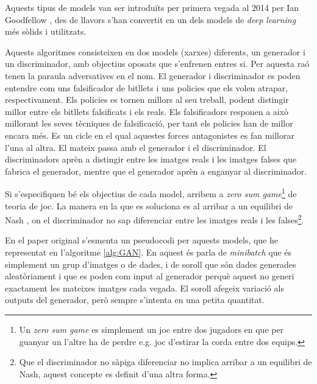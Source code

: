 Aquests tipus de models van ser introduïts per primera vegada al 2014 per Ian Goodfellow \cite{GAN2014}, des de llavors s'han convertit en un dels models de \textit{deep learning} més sòlids i utilitzats. 

Aquests algoritmes consisteixen en dos models (xarxes) diferents, un generador i un discriminador, amb objectius oposats que s'enfrenen entres si. Per aquesta raó tenen la paraula adversatives en el nom. El generador i discriminador es poden entendre com uns falsificador de bitllets i uns policies que els volen atrapar, respectivament. Els policies es tornen millors al seu treball, podent distingir millor entre els bitllets falsificats i els reals. Els falsificadors responen a això millorant les seves tècniques de falsificació, per tant els policies han de millor encara més. Es un cicle en el qual aquestes forces antagonistes es fan millorar l'una al altra. El mateix passa amb el generador i el discriminador. El discriminadors aprèn a distingir entre les imatges reals i les imatges falses que fabrica el generador, mentre que el generador aprèn a enganyar al discriminador. 

Si s'especifiquen bé els objectius de cada model, arribem a \textit{zero sum game}\footnote{Un \textit{zero sum game} es simplement un joc entre dos jugadors en que per guanyar un l'altre ha de perdre e.g. joc d'estirar la corda entre dos equips.} de teoria de joc. La manera en la que es soluciona es al arribar a un equilibri de Nash \cite{QGAN_exp}, on el discriminador no sap diferenciar entre les imatges reals i les falses\footnote{Que el discriminador no sàpiga diferenciar no implica arribar a un equilibri de Nash, aquest concepte es definit d'una altra forma.}.

En el paper original \cite{GAN2014} s'esmenta un pseudocodi per aquests models, que he representat en l'algoritme \ref{alg:GAN}. En aquest és parla de \textit{minibatch} que és simplement un grup d'imatges o de dades, i de soroll que són dades generades aleatòriament i que es poden com input al generador perquè aquest no generi exactament les mateixes imatges cada vegada. El soroll afegeix variació als outputs del generador, però sempre s'intenta en una petita quantitat. 

